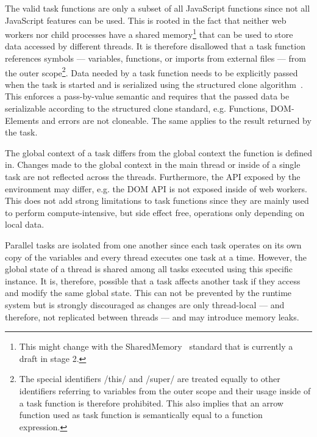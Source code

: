 The valid task functions are only a subset of all JavaScript functions since not all JavaScript features can be used. This is rooted in the fact that neither web workers nor child processes have a shared memory\footnote{This might change with the SharedMemory~\cite{Ecma2016} standard that is currently a draft in stage 2.} that can be used to store data accessed by different threads. It is therefore disallowed that a task function references symbols --- variables, functions, or imports from external files --- from the outer scope\footnote{The special identifiers \javascriptinline/this/ and \javascriptinline/super/ are treated equally to other identifiers referring to variables from the outer scope and their usage inside of a task function is therefore prohibited. This also implies that an arrow function used as task function is semantically equal to a function expression.}. Data needed by a task function needs to be explicitly passed when the task is started and is serialized using the structured clone algorithm~\cite[Section 2.9.4]{WHATWG2016}. This enforces a pass-by-value semantic and requires that the passed data be serializable according to the structured clone standard, e.g. Functions, DOM-Elements and errors are not cloneable. The same applies to the result returned by the task. 

The global context of a task differs from the global context the function is defined in. Changes made to the global context in the main thread or inside of a single task are not reflected across the threads. Furthermore, the API exposed by the environment may differ, e.g. the DOM API is not exposed inside of web workers. This does not add strong limitations to task functions since they are mainly used to perform compute-intensive, but side effect free,  operations only depending on local data.

Parallel tasks are isolated from one another since each task operates on its own copy of the variables and every thread executes one task at a time. However, the global state of a thread is shared among all tasks executed using this specific instance. It is, therefore, possible that a task affects another task if they access and modify the same global state. This can not be prevented by the runtime system but is strongly discouraged as changes are only thread-local --- and therefore, not replicated between threads --- and may introduce memory leaks. 

